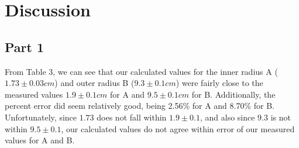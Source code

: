 \documentclass[letterpaper]{article}
\begin{document}
%
%
%
%



\section{Discussion}

\subsection{Part 1}
From Table 3, we can see that our calculated values for the inner radius A
($1.73 \pm 0.03 cm$)
and outer radius B
($9.3 \pm 0.1 cm$) were fairly close to the measured values $1.9 \pm 0.1 cm$ for A
and $ 9.5 \pm 0.1 cm$ for B.
Additionally, the percent error did seem relatively good, being 2.56\% for A and 8.70\% for B.
Unfortunately, since $1.73$ does not fall within $1.9 \pm 0.1$,
and also since $9.3$ is not within $9.5 \pm 0.1$, our calculated values do not
agree within error of our measured values for A and B.
\end{document}

